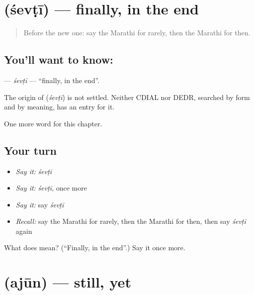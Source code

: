 \section[\texorpdfstring{\mr{शेवटी} (śevṭī)}{शेवटी (śevṭī)}]{ (śevṭī) — finally, in the end}

\label{lesson:MR-C171-sevti}



\begin{quote}
Before the new one: say the Marathi for rarely, then the Marathi for then.
\end{quote}

\subsection*{You'll want to know: }
\textbf{} — \emph{śevṭī} — \textquotedblleft{}finally, in the end\textquotedblright{}.

\begin{cousinweb}
The origin of \textbf{} (\emph{śevṭī}) is not settled. Neither CDIAL nor DEDR, searched by form and by meaning, has an entry for it.
\end{cousinweb}

\begin{grammarlens}[title={What you've built}]
One more word for this chapter.
\end{grammarlens}

\subsection*{Your turn}
\begin{itemize}
\raggedright
  \item \emph{Say it:} \emph{śevṭī}
  \item \emph{Say it:} \emph{śevṭī}, once more
  \item \emph{Say it:} say \emph{śevṭī}
  \item \emph{Recall:} say the Marathi for rarely, then the Marathi for then, then say \emph{śevṭī} again
\end{itemize}

\begin{tcolorbox}[breakable,colback=teal!4,colframe=teal!35!black,title={Before you move on}]
What does  mean? (\textquotedblleft{}Finally, in the end\textquotedblright{}.) Say it once more.
\end{tcolorbox}
\section[\texorpdfstring{\mr{अजून} (ajūn)}{अजून (ajūn)}]{ (ajūn) — still, yet}

